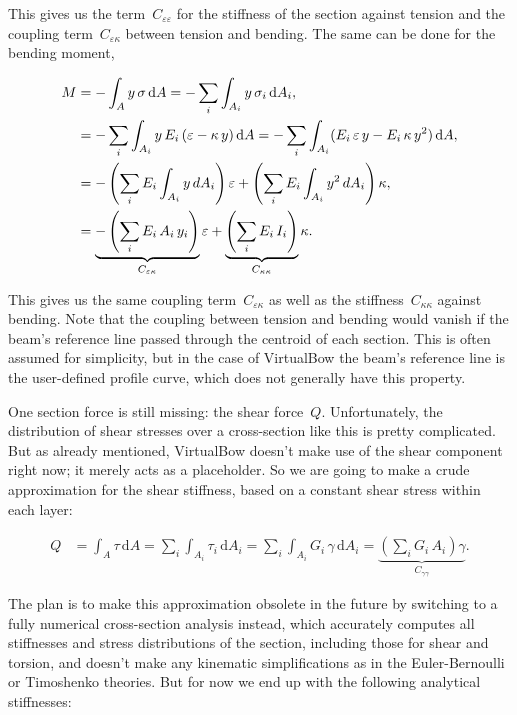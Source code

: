 This gives us the term~$C_{\varepsilon\varepsilon}$ for the stiffness of the section against tension and the coupling term~$C_{\varepsilon\kappa}$ between tension and bending.
The same can be done for the bending moment,

\begin{align}
M &= -\int_A y\,\sigma\,\mathrm{d}A = -\sum_i\int_{A_i}y\,\sigma_i\,\mathrm{d}A_i,\notag\\
&= -\sum_i\int_{A_i}y\,E_i\,(\varepsilon - \kappa\,y)\,\mathrm{d}A = -\sum_i\int_{A_i}(E_i\,\varepsilon\,y - E_i\,\kappa\,y^2)\,\mathrm{d}A,\notag\\
&= -\left(\sum_i E_i\int_{A_i}y\,dA_{i}\right)\varepsilon + \left(\sum_i E_i\int_{A_i}y^2\,dA_i\right)\kappa,\notag\\
&=
\underbrace{
-\left(\sum_i E_i\,A_i\,y_i\right)
}_{C_{\varepsilon\kappa}}
\varepsilon +
\underbrace{
\left(\sum_i E_i\,I_{i}\right)
}_{C_{\kappa\kappa}}
\kappa.\label{eq:elements:beam:constitutive_2}
\end{align}

This gives us the same coupling term~$C_{\varepsilon\kappa}$ as well as the stiffness~$C_{\kappa\kappa}$ against bending.
Note that the coupling between tension and bending would vanish if the beam's reference line passed through the centroid of each section.
This is often assumed for simplicity, but in the case of VirtualBow the beam's reference line is the user-defined profile curve, which does not generally have this property.

One section force is still missing: the shear force~$Q$.
Unfortunately, the distribution of shear stresses over a cross-section like this is pretty complicated.
But as already mentioned, VirtualBow doesn't make use of the shear component right now; it merely acts as a placeholder.
So we are going to make a crude approximation for the shear stiffness, based on a constant shear stress within each layer:

\begin{align}
Q &= \int_A \tau\,\mathrm{d}A = \sum_i\int_{A_i}\tau_i\,\mathrm{d}A_i = \sum_i\int_{A_i}G_i\,\gamma\,\mathrm{d}A_i = \underbrace{
\left(\sum_i G_i\,A_i\right)\gamma
}_{C_{\gamma\gamma}}.\label{eq:elements:beam:constitutive_3}
\end{align}

The plan is to make this approximation obsolete in the future by switching to a fully numerical cross-section analysis instead, which accurately computes all stiffnesses and stress distributions of the section, including those for shear and torsion, and doesn't make any kinematic simplifications as in the Euler-Bernoulli or Timoshenko theories.
But for now we end up with the following analytical stiffnesses:

